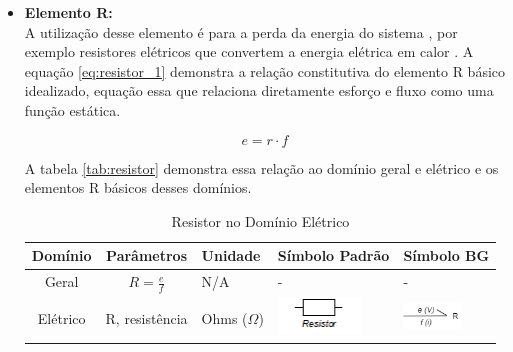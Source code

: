 \begin{itemize}
    \item \textbf{Elemento R:} \\
    A utilização desse elemento é para a perda da energia do sistema \cite{borutzky2009bond}, por exemplo resistores elétricos que convertem a energia elétrica em calor \cite{dorf}. A equação \ref{eq:resistor_1} demonstra a relação constitutiva do elemento R básico idealizado, equação essa que relaciona diretamente esforço e fluxo como uma função estática.

    \begin{equation}
        \label{eq:resistor_1}
        e = r\cdot f 
    \end{equation}

    A tabela \ref{tab:resistor} demonstra essa relação  ao domínio geral e elétrico e os elementos R básicos desses domínios.

    \begin{table}[H]
    \centering
        \caption{Resistor no Domínio Elétrico}
        \label{tab:resistor}
            \begin{tabular}{| c | c | C{2.5cm} | C{2cm} | C{3cm}|}
            \hline
            \textbf{Domínio} & \textbf{Parâmetros} & \textbf{Unidade} & \textbf{Símbolo Padrão} & \textbf{Símbolo BG}\\ \hline
            Geral & \begin{minipage}[c][11mm][c]{.12\textwidth}
            \vspace{1mm} \(R = \frac{e}{f}\) \end{minipage} & N/A & -  & - \\ \hline
        
            Elétrico & R, resistência & Ohms ($\Omega$) & \begin{minipage}[c][11mm][c]{.12\textwidth}
            \vspace{1mm} \includegraphics[width=\linewidth, height=10mm]{figuras/Embasamento/resistor.png}\label{fig:res}
            \end{minipage} & \begin{minipage}[c][11mm][c]{.12\textwidth}
            \vspace{1mm} \includegraphics[width=\linewidth, height=7mm]{figuras/Embasamento/BG_resistor.png}\label{fig:BG_res}
            \end{minipage} \\ \hline
        \end{tabular}
    \end{table}
    

\end{itemize}
